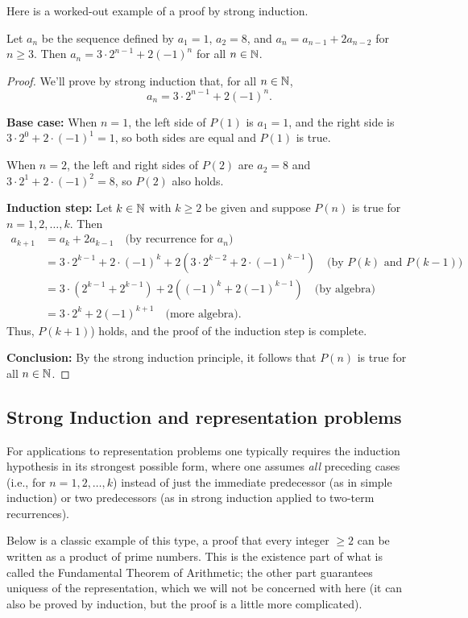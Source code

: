 Here is a worked-out example of a proof by strong induction.


\begin{prop}{}
Let $a_n$ be the sequence defined by 
$a_1=1$, $a_2=8$, and $a_n=a_{n-1}+2a_{n-2}$ for $n\ge3$.
Then
$a_n=3\cdot 2^{n-1}+2(-1)^n$ for all $n\in\mathbb{N}$.
\end{prop}

\begin{proof}
We'll prove by strong induction that, for all $n\in\mathbb{N}$, 
\[
\tag{$P(n)$}
a_n=3\cdot 2^{n-1}+2(-1)^n.
\]

\textbf{Base case:} 
When $n=1$, the left side of $P(1)$ is $a_1 =1$, and
the right side is $3\cdot 2^{0}+2\cdot(-1)^1=1$,
so both sides are equal and $P(1)$ is
true. 

When $n=2$, the left and right sides of $P(2)$ are
$a_2=8$ and $3\cdot 2^1+2\cdot(-1)^2=8$, so $P(2)$ also holds.


\textbf{Induction step:} Let $k\in\mathbb{N}$ with $k\ge2$ be given and suppose 
$P(n)$ is true for $n=1,2,\dots,k$. Then
\begin{align*}
a_{k+1}&=a_{k}+2a_{k-1}
\quad \text{(by recurrence for $a_n$)}
\\
&=
3\cdot 2^{k-1}+2\cdot(-1)^k
+2\left(3\cdot 2^{k-2}+2\cdot(-1)^{k-1}\right)
\quad \text{(by $P(k)$ and $P(k-1)$)}
\\
&=
3\cdot \left(2^{k-1}+2^{k-1}\right) 
+2\left((-1)^k+2(-1)^{k-1}\right)
\quad \text{(by algebra)}
\\
&=
3\cdot 2^k+2(-1)^{k+1}
\quad \text{(more algebra).}
\end{align*}
Thus, $P(k+1)$) holds, and the proof of the induction step is complete. 

\textbf{Conclusion:} By the strong induction principle,  it follows that
$P(n)$ is true for all $n\in\mathbb{N}$.  
\end{proof}

\subsection*{Strong Induction and representation problems}
For applications to representation problems one 
typically requires the induction hypothesis in its strongest possible
form, where one assumes \emph{all} preceding
cases (i.e., for $n=1,2,\dots,k$) instead of just the immediate
predecessor (as in simple induction) or two predecessors (as in strong induction applied to two-term recurrences). 

Below is a classic example of this type, a proof that every integer
$\ge2$ can be written as a product of prime numbers. This is the
existence part of what is called the Fundamental Theorem of Arithmetic;
the other part guarantees uniquess of the representation, which we will
not be concerned with here (it can also be proved by induction, but the proof is a little more complicated).  

